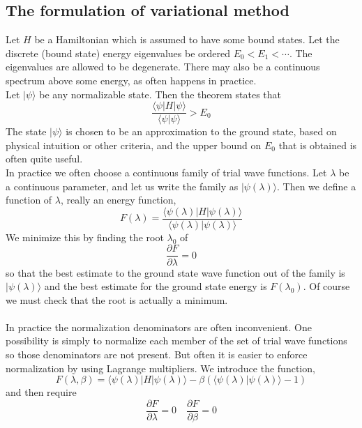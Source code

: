 \subsection{The formulation of variational method}
Let $H$ be a Hamiltonian which is assumed to have some bound states. Let the discrete (bound state) energy eigenvalues be ordered $E_0 < E_1 < \cdots$. The eigenvalues are allowed to be degenerate. There may also be a continuous spectrum above some energy, as often happens in practice.\\
Let $|\psi\rangle$ be any normalizable state. Then the theorem states that
\[\frac{\langle \psi | H | \psi \rangle}{\langle \psi | \psi \rangle} > E_0\]
The state $|\psi\rangle$ is chosen to be an approximation to the ground state, based on physical intuition or other criteria, and the upper bound on $E_0$ that is obtained is often quite useful. \\
In practice we often choose a continuous family of trial wave functions. Let $\lambda$ be a continuous parameter, and let us write the family as $|\psi(\lambda)\rangle$. Then we define a function of $\lambda$, really an energy function,
\[F(\lambda) = \frac{\langle \psi(\lambda) | H | \psi(\lambda) \rangle}{\langle \psi(\lambda) | \psi(\lambda) \rangle}\]
We minimize this by finding the root $\lambda_0$ of
\[\frac{\partial F}{\partial \lambda} = 0\]
so that the best estimate to the ground state wave function out of the family is $|\psi(\lambda)\rangle$ and the best estimate for the ground state energy is $F(\lambda_0)$. 
Of course we must check that the root is actually a minimum.
\\ \\
In practice the normalization denominators are often inconvenient. One possibility is simply to normalize each member of the set of trial wave functions so those denominators are not
present. 
But often it is easier to enforce normalization by using Lagrange multipliers. We introduce the function,
\[F(\lambda,\beta) = \langle \psi(\lambda) | H | \psi(\lambda) \rangle - \beta (\langle \psi(\lambda) | \psi(\lambda) \rangle - 1)\]
and then require
\[\frac{\partial F}{\partial \lambda} = 0 \quad \frac{\partial F}{\partial \beta} = 0\]

